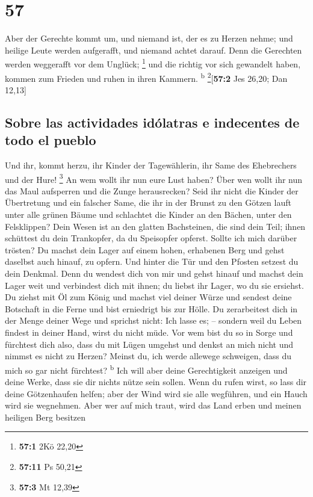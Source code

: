 \hypertarget{section-56}{%
\section{57}\label{section-56}}

 Aber der Gerechte kommt um, und niemand ist, der es zu
Herzen nehme; und heilige Leute werden aufgerafft, und niemand achtet
darauf. Denn die Gerechten werden weggerafft vor dem Unglück;
\footnote{\textbf{57:1} 2Kö 22,20}  und die richtig vor
sich gewandelt haben, kommen zum Frieden und ruhen in ihren Kammern.
\textsuperscript{b} \footnote{\textbf{57:11} Ps 50,21}{[}\textbf{57:2}
Jes 26,20; Dan 12,13{]}

\hypertarget{sobre-las-actividades-iduxf3latras-e-indecentes-de-todo-el-pueblo}{%
\subsection{Sobre las actividades idólatras e indecentes de todo el
pueblo}\label{sobre-las-actividades-iduxf3latras-e-indecentes-de-todo-el-pueblo}}

 Und ihr, kommt herzu, ihr Kinder der Tagewählerin, ihr
Same des Ehebrechers und der Hure! \footnote{\textbf{57:3} Mt 12,39}
 An wem wollt ihr nun eure Lust haben? Über wen wollt ihr
nun das Maul aufsperren und die Zunge herausrecken? Seid ihr nicht die
Kinder der Übertretung und ein falscher Same,  die ihr in
der Brunst zu den Götzen lauft unter alle grünen Bäume und schlachtet
die Kinder an den Bächen, unter den Felsklippen?  Dein
Wesen ist an den glatten Bachsteinen, die sind dein Teil; ihnen
schüttest du dein Trankopfer, da du Speisopfer opferst. Sollte ich mich
darüber trösten?  Du machst dein Lager auf einem hohen,
erhabenen Berg und gehst daselbst auch hinauf, zu opfern. 
Und hinter die Tür und den Pfosten setzest du dein Denkmal. Denn du
wendest dich von mir und gehst hinauf und machst dein Lager weit und
verbindest dich mit ihnen; du liebst ihr Lager, wo du sie ersiehst.
 Du ziehst mit Öl zum König und machst viel deiner Würze
und sendest deine Botschaft in die Ferne und bist erniedrigt bis zur
Hölle.  Du zerarbeitest dich in der Menge deiner Wege und
sprichst nicht: Ich lasse es; -- sondern weil du Leben findest in deiner
Hand, wirst du nicht müde.  Vor wem bist du so in Sorge
und fürchtest dich also, dass du mit Lügen umgehst und denkst an mich
nicht und nimmst es nicht zu Herzen? Meinst du, ich werde allewege
schweigen, dass du mich so gar nicht fürchtest? \textsuperscript{b}
 Ich will aber deine Gerechtigkeit anzeigen und deine
Werke, dass sie dir nichts nütze sein sollen.  Wenn du
rufen wirst, so lass dir deine Götzenhaufen helfen; aber der Wind wird
sie alle wegführen, und ein Hauch wird sie wegnehmen. Aber wer auf mich
traut, wird das Land erben und meinen heiligen Berg besitzen

